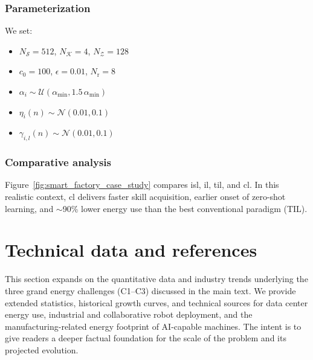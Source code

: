 \subsubsection{Parameterization}
We set:
\begin{itemize}
    \item $N_\mathcal{S} = 512$, $N_\mathcal{K} = 4$, $N_\mathcal{Z} = 128$
    \item $c_0 = 100$, $\epsilon = 0.01$, $N_\mathrm{r} = 8$
    \item $\alpha_i \sim \mathcal{U}(\alpha_\mathrm{min}, 1.5\,\alpha_\mathrm{min})$
    \item $\eta_i(n) \sim \mathcal{N}(0.01, 0.1)$
    \item $\gamma_{i,l}(n) \sim \mathcal{N}(0.01, 0.1)$
\end{itemize}

\subsubsection{Comparative analysis}
Figure~\ref{fig:smart_factory_case_study} compares \ac{isl}, \ac{il}, \ac{til}, and \ac{cl}. In this realistic context, \ac{cl} delivers faster skill acquisition, earlier onset of zero-shot learning, and $\sim$90\% lower energy use than the best conventional paradigm (TIL).



\newpage
\section{Technical data and references}\label{sec:technical_data_and_references}
This section expands on the quantitative data and industry trends underlying the three grand energy challenges (C1–C3) discussed in the main text. We provide extended statistics, historical growth curves, and technical sources for data center energy use, industrial and collaborative robot deployment, and the manufacturing-related energy footprint of AI-capable machines. The intent is to give readers a deeper factual foundation for the scale of the problem and its projected evolution.

